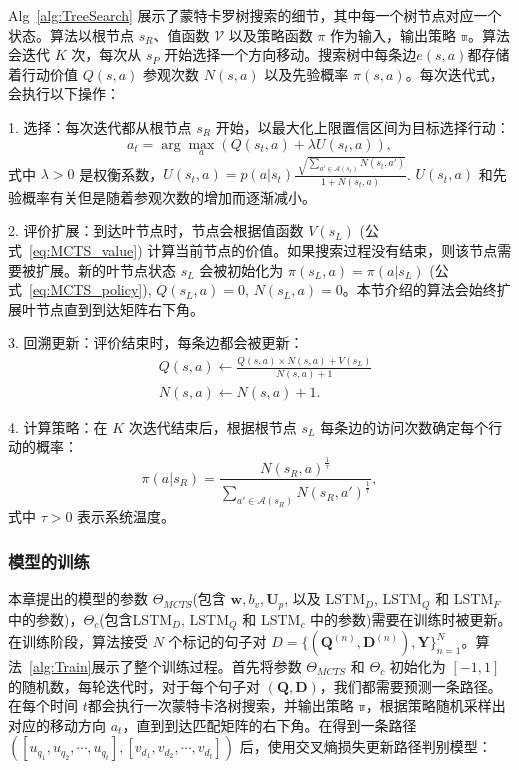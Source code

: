 Alg~\ref{alg:TreeSearch} 展示了蒙特卡罗树搜索的细节，其中每一个树节点对应一个状态。算法以根节点 $s_R$、值函数 $\mathcal{V}$ 以及策略函数 $\pi$ 作为输入，输出策略 $\mathbb{\pi}$。算法会迭代 $K$ 次，每次从 $s_P$ 开始选择一个方向移动。搜索树中每条边$e(s,a)$都存储着行动价值 $Q(s,a)$ 参观次数 $N(s,a)$ 以及先验概率 $\pi(s,a)$。每次迭代式，会执行以下操作：

1. 选择：每次迭代都从根节点 $s_R$ 开始，以最大化上限置信区间为目标选择行动：
\begin{equation}\label{eq:Selection}
  a_t = \arg\max_a (Q(s_t, a) + \lambda U(s_t, a)),
\end{equation}
式中 $\lambda >0$ 是权衡系数，$U(s_t, a) =  p(a|s_t)\frac{\sqrt[]{\sum_{a'\in\mathcal{A}(s_t)} N(s_t, a')}}{1 + N(s_t, a)}$. $U(s_t, a)$ 和先验概率有关但是随着参观次数的增加而逐渐减小。

2. 评价扩展：到达叶节点时，节点会根据值函数 $V(s_L)$ (公式~\ref{eq:MCTS_value}) 计算当前节点的价值。如果搜索过程没有结束，则该节点需要被扩展。新的叶节点状态 $s_L$ 会被初始化为 $\pi(s_L, a) =\pi(a|s_L)$ (公式~\ref{eq:MCTS_policy}), $Q(s_L, a)= 0$, $N(s_L, a) = 0$。本节介绍的算法会始终扩展叶节点直到到达矩阵右下角。

3. 回溯更新：评价结束时，每条边都会被更新：
\begin{equation}
\label{eq:UpdateQN}
\begin{aligned}
  &Q(s, a) \leftarrow  \frac{Q(s, a) \times N(s, a) + V(s_L)}{N(s, a) + 1}\\
  &N(s, a) \leftarrow  N(s, a) + 1.
\end{aligned}
\end{equation}

4. 计算策略：在 $K$ 次迭代结束后，根据根节点 $s_L$ 每条边的访问次数确定每个行动的概率：
\begin{equation}\label{eq:SearchProb}
\pi(a|s_R) = \frac{N(s_R, a)^{\frac{1}{\tau}}}{\sum_{a'\in\mathcal{A}(s_R)} N(s_R, a')^{\frac{1}{\tau}}},
\end{equation}
式中 $\tau > 0$ 表示系统温度。

\subsubsection{模型的训练}
本章提出的模型的参数 $\Theta_{MCTS}$(包含 $\mathbf{w}, b_v, \mathbf{U}_p$, 以及 LSTM$_D$, LSTM$_Q$ 和 LSTM$_F$中的参数)，$\Theta_{c}$(包含LSTM$_D$, LSTM$_Q$ 和 LSTM$_c$ 中的参数)需要在训练时被更新。在训练阶段，算法接受 $N$ 个标记的句子对 $D = \{ (\mathbf{Q}^{(n)}, \mathbf{D}^{(n)}), \mathbf{Y}\}_{n=1}^{N}$。算法~\ref{alg:Train}展示了整个训练过程。首先将参数  $\Theta_{MCTS}$ 和 $\Theta_{c}$ 初始化为 $[-1, 1]$ 的随机数，每轮迭代时，对于每个句子对 $(\mathbf{Q}, \mathbf{D})$，我们都需要预测一条路径。在每个时间 $t$都会执行一次蒙特卡洛树搜索，并输出策略 $\mathbb{\pi}$，根据策略随机采样出对应的移动方向 $a_t$，直到到达匹配矩阵的右下角。在得到一条路径 $([u_{q_1}, u_{q_2}, \cdots, u_{q_t}], [v_{d_1}, v_{d_2}, \cdots, v_{d_t}])$ 后，使用交叉熵损失更新路径判别模型：

